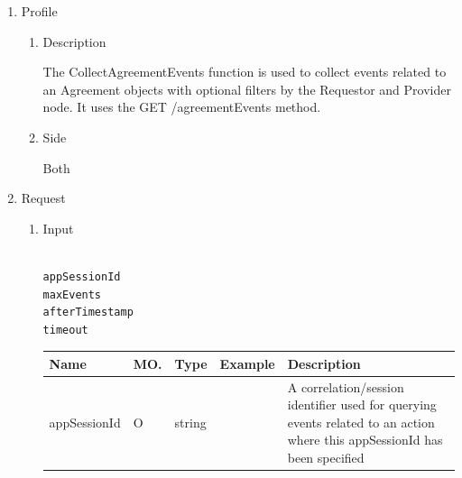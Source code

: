 \newpage


\begin{enumerate}

\item Profile

\begin{enumerate}

\item Description

The CollectAgreementEvents function is used to collect events related to an Agreement objects with optional filters by the Requestor and Provider node. 
It uses the GET /agreementEvents method.

\item Side

Both

\end{enumerate}

\item Request

\begin{enumerate}

\item Input

\begin{tcolorbox}[boxrule=0pt, frame empty]
\begin{verbatim}

appSessionId
maxEvents
afterTimestamp
timeout

\end{verbatim}
\end{tcolorbox}


\begin{table}[H]
\footnotesize

\begin{center}
\begin{tabular}{|p{3cm}|l|p{3cm}|p{3cm}|p{4cm}|} 
\hline
\rowcolor{lightgray}	Name	& MO.	& Type	& Example & 	Description \\
\hline

appSessionId	& O & 	string				&			& A correlation/session identifier used for querying events related to an action where this appSessionId has been specified \\
\hline


\end{tabular}
\end{center}
\end{table}
\end{enumerate}
\end{enumerate}
